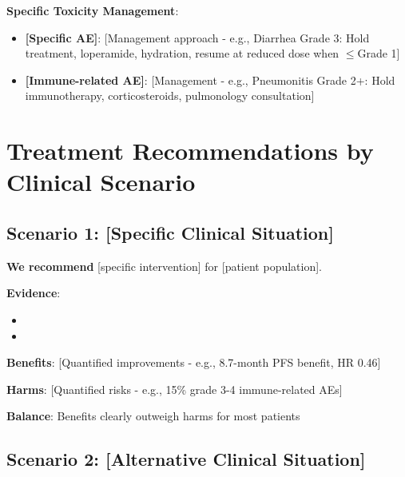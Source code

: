 \documentclass[10pt,letterpaper]{article}
\begin{document}
\textbf{Specific Toxicity Management}:
\begin{itemize}
\item \textbf{[Specific AE]}: [Management approach - e.g., Diarrhea Grade 3: Hold treatment, loperamide, hydration, resume at reduced dose when $\leq$Grade 1]
\item \textbf{[Immune-related AE]}: [Management - e.g., Pneumonitis Grade 2+: Hold immunotherapy, corticosteroids, pulmonology consultation]
\end{itemize}

\section{Treatment Recommendations by Clinical Scenario}

\subsection{Scenario 1: [Specific Clinical Situation]}

\begin{tcolorbox}[enhanced,colback=stronggreen!10,colframe=stronggreen,
title={\textbf{RECOMMENDATION} \hfill \textbf{GRADE: 1A}},
fonttitle=\bfseries\small,coltitle=black]
{\small
\textbf{We recommend} [specific intervention] for [patient population].

\textbf{Evidence}:
\begin{itemize}
\item [Primary supporting evidence with results]
\item [Guideline concordance - NCCN, ASCO, ESMO]
\end{itemize}

\textbf{Benefits}: [Quantified improvements - e.g., 8.7-month PFS benefit, HR 0.46]

\textbf{Harms}: [Quantified risks - e.g., 15\% grade 3-4 immune-related AEs]

\textbf{Balance}: Benefits clearly outweigh harms for most patients
}
\end{tcolorbox}

\subsection{Scenario 2: [Alternative Clinical Situation]}
\end{document}
